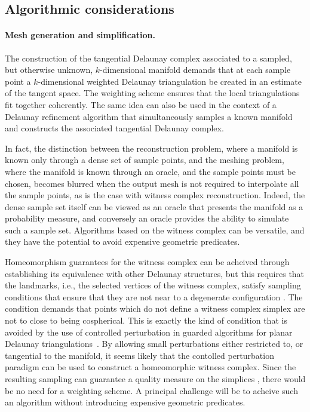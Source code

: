 

\subsection*{Algorithmic considerations}

\paragraph{Mesh generation and simplification.}
The construction of the tangential Delaunay complex associated to a
sampled, but otherwise unknown, $k$-dimensional manifold demands that
at each sample point a $k$-dimensional weighted Delaunay triangulation
be created in an estimate of the tangent space. The weighting scheme
ensures that the local triangulations fit together coherently. The
same idea can also be used in the context of a Delaunay refinement
algorithm that simultaneously samples a known manifold and constructs
the associated tangential Delaunay complex. 

In fact, the distinction between the reconstruction problem, where a
manifold is known only through a dense set of sample points, and the
meshing problem, where the manifold is known through an oracle, and
the sample points must be chosen, becomes blurred when the output mesh
is not required to interpolate all the sample points, as is the case
with witness complex reconstruction. Indeed, the dense sample set
itself can be viewed as an oracle that presents the manifold as a
probability measure, and conversely an oracle provides the ability to
simulate such a sample set. Algorithms based on the witness complex
can be versatile, and they have the potential to avoid expensive
geometric predicates.

Homeomorphism guarantees for the witness complex can be acheived
through establishing its equivalence with other Delaunay structures,
but this requires that the landmarks, i.e., the selected vertices of
the witness complex, satisfy sampling conditions that ensure that they
are not near to a degenerate configuration
\cite{boissonnat2011cgl,boissonnat2012stab}.  The condition demands
that points which do not define a witness complex simplex are not to
close to being cospherical. This is exactly the kind of condition that
is avoided by the use of controlled perturbation in guarded algorithms
for planar Delaunay triangulations~\cite{funke2005cp}. By allowing
small perturbations either restricted to, or tangential to the
manifold, it seems likely that the contolled perturbation paradigm can
be used to construct a homeomorphic witness complex. Since the
resulting sampling can guarantee a quality measure on the simplices
\cite{boissonnat2012stab}, there would be no need for a weighting
scheme.  A principal challenge will be to acheive such an algorithm
without introducing expensive geometric predicates.

